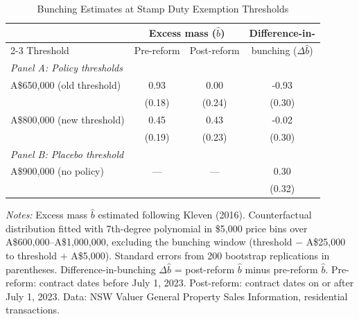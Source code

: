\begin{table}[t]
\centering
\caption{Bunching Estimates at Stamp Duty Exemption Thresholds}
\label{tab:bunching}
\begin{tabular}{lccc}
\hline\hline
& \multicolumn{2}{c}{Excess mass ($\hat{b}$)} & Difference-in- \\
\cmidrule(lr){2-3}
Threshold & Pre-reform & Post-reform & bunching ($\Delta\hat{b}$) \\
\hline
\textit{Panel A: Policy thresholds} & & & \\[3pt]
A\$650,000 (old threshold) & 0.93 & 0.00 & -0.93 \\
  & (0.18) & (0.24) & (0.30) \\
[6pt]
A\$800,000 (new threshold) & 0.45 & 0.43 & -0.02 \\
  & (0.19) & (0.23) & (0.30) \\
[6pt]
\textit{Panel B: Placebo threshold} & & & \\[3pt]
A\$900,000 (no policy) & --- & --- & 0.30 \\
  & & & (0.32) \\
\hline\hline
\end{tabular}
\begin{tablenotes}[flushleft]\small
\item \textit{Notes:} Excess mass $\hat{b}$ estimated following Kleven (2016). Counterfactual distribution fitted with 7th-degree polynomial in \$5,000 price bins over A\$600,000--A\$1,000,000, excluding the bunching window (threshold $-$ A\$25,000 to threshold $+$ A\$5,000). Standard errors from 200 bootstrap replications in parentheses. Difference-in-bunching $\Delta\hat{b}$ = post-reform $\hat{b}$ minus pre-reform $\hat{b}$. Pre-reform: contract dates before July 1, 2023. Post-reform: contract dates on or after July 1, 2023. Data: NSW Valuer General Property Sales Information, residential transactions.
\end{tablenotes}
\end{table}

